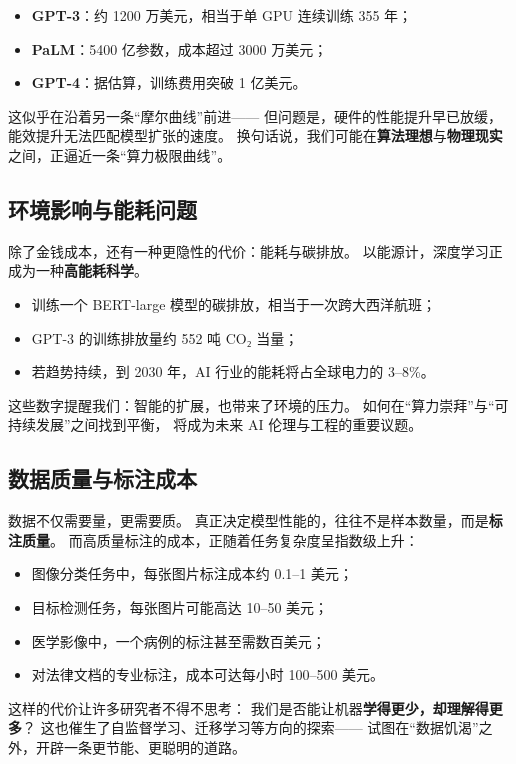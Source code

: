 \begin{itemize}
\item \textbf{GPT-3}：约 1200 万美元，相当于单 GPU 连续训练 355 年；
\item \textbf{PaLM}：5400 亿参数，成本超过 3000 万美元；
\item \textbf{GPT-4}：据估算，训练费用突破 1 亿美元。
\end{itemize}

这似乎在沿着另一条“摩尔曲线”前进——  
但问题是，硬件的性能提升早已放缓，能效提升无法匹配模型扩张的速度。  
换句话说，我们可能在\textbf{算法理想}与\textbf{物理现实}之间，正逼近一条“算力极限曲线”。

\subsection{环境影响与能耗问题}

除了金钱成本，还有一种更隐性的代价：能耗与碳排放。  
以能源计，深度学习正成为一种\textbf{高能耗科学}。  
\begin{itemize}
\item 训练一个 BERT-large 模型的碳排放，相当于一次跨大西洋航班；
\item GPT-3 的训练排放量约 552 吨 CO₂ 当量；
\item 若趋势持续，到 2030 年，AI 行业的能耗将占全球电力的 3–8\%。
\end{itemize}
这些数字提醒我们：智能的扩展，也带来了环境的压力。  
如何在“算力崇拜”与“可持续发展”之间找到平衡，  
将成为未来 AI 伦理与工程的重要议题。

\subsection{数据质量与标注成本}

数据不仅需要量，更需要质。  
真正决定模型性能的，往往不是样本数量，而是\textbf{标注质量}。  
而高质量标注的成本，正随着任务复杂度呈指数级上升：  

\begin{itemize}
\item 图像分类任务中，每张图片标注成本约 0.1–1 美元；
\item 目标检测任务，每张图片可能高达 10–50 美元；
\item 医学影像中，一个病例的标注甚至需数百美元；
\item 对法律文档的专业标注，成本可达每小时 100–500 美元。
\end{itemize}

这样的代价让许多研究者不得不思考：  
我们是否能让机器\textbf{学得更少，却理解得更多}？  
这也催生了自监督学习、迁移学习等方向的探索——  
试图在“数据饥渴”之外，开辟一条更节能、更聪明的道路。

